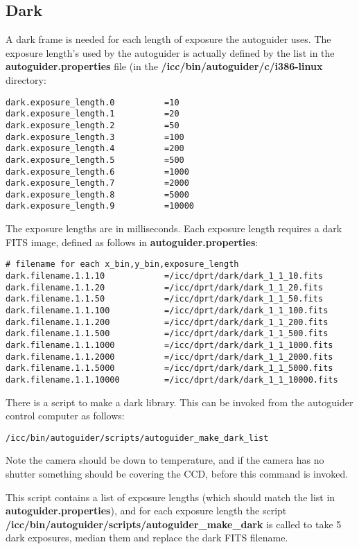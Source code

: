 \documentclass[10pt,a4paper]{article}
\begin{document}
\subsection{Dark}

A dark frame is needed for each length of exposure the autoguider uses. The exposure length's used by the autoguider
is actually defined by the list in the {\bf autoguider.properties} file (in the {\bf /icc/bin/autoguider/c/i386-linux} directory:

\begin{verbatim}
dark.exposure_length.0			=10
dark.exposure_length.1			=20
dark.exposure_length.2			=50
dark.exposure_length.3			=100
dark.exposure_length.4			=200
dark.exposure_length.5			=500
dark.exposure_length.6			=1000
dark.exposure_length.7			=2000
dark.exposure_length.8			=5000
dark.exposure_length.9			=10000
\end{verbatim}

The exposure lengths are in milliseconds. Each exposure length requires a dark FITS image, defined as follows in 
{\bf autoguider.properties}:

\begin{verbatim}
# filename for each x_bin,y_bin,exposure_length
dark.filename.1.1.10			=/icc/dprt/dark/dark_1_1_10.fits
dark.filename.1.1.20			=/icc/dprt/dark/dark_1_1_20.fits
dark.filename.1.1.50			=/icc/dprt/dark/dark_1_1_50.fits
dark.filename.1.1.100			=/icc/dprt/dark/dark_1_1_100.fits
dark.filename.1.1.200			=/icc/dprt/dark/dark_1_1_200.fits
dark.filename.1.1.500			=/icc/dprt/dark/dark_1_1_500.fits
dark.filename.1.1.1000			=/icc/dprt/dark/dark_1_1_1000.fits
dark.filename.1.1.2000			=/icc/dprt/dark/dark_1_1_2000.fits
dark.filename.1.1.5000			=/icc/dprt/dark/dark_1_1_5000.fits
dark.filename.1.1.10000			=/icc/dprt/dark/dark_1_1_10000.fits
\end{verbatim}

There is a script to make a dark library. This can be invoked from the autoguider control computer as follows:
\begin{verbatim}
/icc/bin/autoguider/scripts/autoguider_make_dark_list
\end{verbatim}
Note the camera should be down to temperature, and if the camera has no shutter something should be covering the CCD, before this command is invoked.

This script contains a list of exposure lengths (which should match the list in {\bf autoguider.properties}), and for each exposure length the script {\bf /icc/bin/autoguider/scripts/autoguider\_make\_dark} is called to take 5 dark exposures, median them and replace the dark FITS filename.
\end{document}
